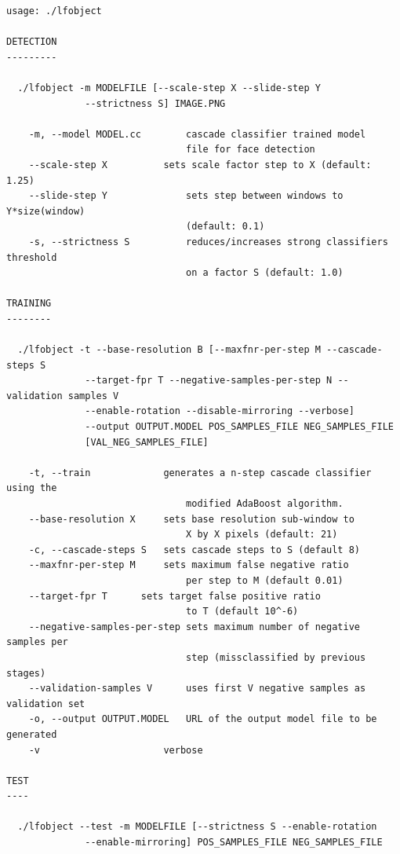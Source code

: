 \documentclass[11pt,spanish,a4paper]{article} %
\begin{document}
\begin{scriptsize}
\begin{lstlisting}
usage: ./lfobject

DETECTION
---------

  ./lfobject -m MODELFILE [--scale-step X --slide-step Y 
              --strictness S] IMAGE.PNG

    -m, --model MODEL.cc        cascade classifier trained model 
                                file for face detection
    --scale-step X	        sets scale factor step to X (default: 1.25)
    --slide-step Y              sets step between windows to Y*size(window) 
                                (default: 0.1)
    -s, --strictness S          reduces/increases strong classifiers threshold
                                on a factor S (default: 1.0)

TRAINING
--------

  ./lfobject -t --base-resolution B [--maxfnr-per-step M --cascade-steps S 
              --target-fpr T --negative-samples-per-step N --validation samples V
              --enable-rotation --disable-mirroring --verbose]
              --output OUTPUT.MODEL POS_SAMPLES_FILE NEG_SAMPLES_FILE 
              [VAL_NEG_SAMPLES_FILE]

    -t, --train		        generates a n-step cascade classifier using the 
                                modified AdaBoost algorithm.
    --base-resolution X		sets base resolution sub-window to 
                                X by X pixels (default: 21)
    -c, --cascade-steps S	sets cascade steps to S (default 8)
    --maxfnr-per-step M		sets maximum false negative ratio 
                                per step to M (default 0.01)
    --target-fpr T		sets target false positive ratio
                                to T (default 10^-6)
    --negative-samples-per-step sets maximum number of negative samples per
                                step (missclassified by previous stages)
    --validation-samples V      uses first V negative samples as validation set
    -o, --output OUTPUT.MODEL	URL of the output model file to be generated
    -v		                verbose

TEST
----

  ./lfobject --test -m MODELFILE [--strictness S --enable-rotation 
              --enable-mirroring] POS_SAMPLES_FILE NEG_SAMPLES_FILE
\end{lstlisting}
\end{scriptsize}

\end{document}
